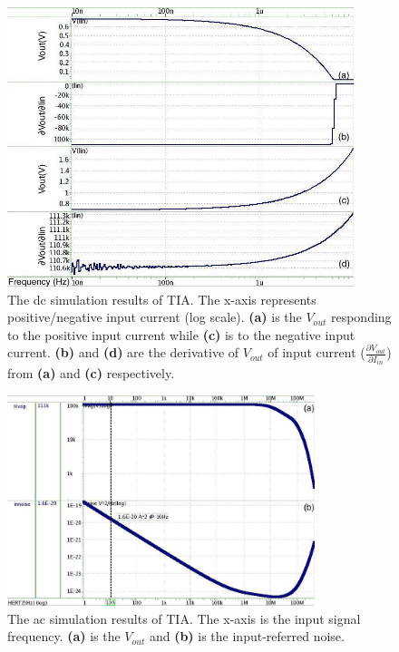 {\begin{figure}[tbp]
    \centering
        \includegraphics[width=0.9\textwidth] {images/chapter5/postSim/TIA_dc.jpg}
    \caption{The dc simulation results of TIA. The x-axis represents positive/negative input current (log scale). \textbf{(a)} is the $V_{out}$ responding to the positive input current while \textbf{(c)} is to the negative input current.
                    \textbf{(b)} and \textbf{(d)} are the derivative of $V_{out}$ of input current ($\frac{\partial V_{out}}{\partial {I_{in}}}$) from \textbf{(a)} and \textbf{(c)} respectively.}
    \label{fig:TIA_postSim_dc}
\end{figure}
\begin{figure}[tbp]
    \centering
        \includegraphics[width=0.8\textwidth] {images/chapter5/postSim/TIA_ac.jpg}
    \caption{The ac simulation results of TIA. The x-axis is the input signal frequency. \textbf{(a)} is the $V_{out}$ and \textbf{(b)} is the input-referred noise.}
    \label{fig:TIA_postSim_ac}
\end{figure}


}
